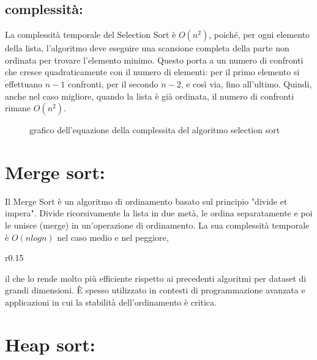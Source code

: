 \documentclass{article}
\begin{document}
\subsection{complessità:}
La complessità temporale del Selection Sort è \(O(n^2)\), poiché, per ogni elemento della lista, l'algoritmo deve eseguire una scansione completa della 
parte non ordinata per trovare l'elemento minimo. Questo porta a un numero di confronti che cresce quadraticamente con il numero di elementi: per il primo elemento 
si effettuano \(n-1\) confronti, per il secondo \(n-2\), e così via, fino all'ultimo. Quindi, anche nel caso migliore, quando la lista è già ordinata, il numero di 
confronti rimane \(O(n^2)\). 
\begin{figure}[h]
    \caption{grafico dell'equazione della complessita del algoritmo selection sort}
\end{figure}

\section{Merge sort:}
Il Merge Sort è un algoritmo di ordinamento basato sul principio "divide et impera". Divide ricorsivamente la lista in due metà, le ordina 
separatamente e poi le unisce (merge) in un'operazione di ordinamento. La sua complessità temporale è \(O(n log n)\) nel caso medio e nel peggiore, 
\begin{wrapfigure}{r}{0.15\textwidth}
    \centering
\end{wrapfigure}
il che lo rende molto più efficiente rispetto ai precedenti algoritmi per dataset di grandi dimensioni. È spesso utilizzato in contesti di 
programmazione avanzata e applicazioni in cui la stabilità dell'ordinamento è critica.

\section{Heap sort:}
\end{document}
